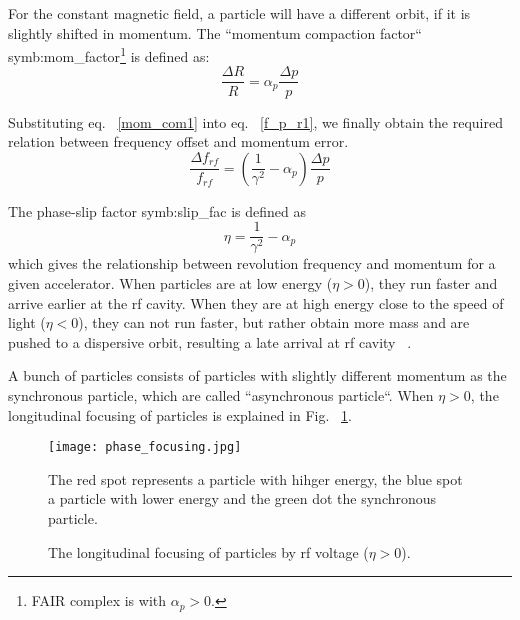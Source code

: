 For the constant magnetic field, a particle will have a different orbit, if it is slightly shifted in momentum. The ``momentum compaction factor`` \gls{symb:mom_factor}\footnote{FAIR complex is with $\alpha_p>0$.} is defined as:
\begin{equation}
\frac{\Delta R}{R}=\alpha_p\frac{\Delta p}{p}\label{mom_com1}
\end{equation} 


Substituting eq. ~\ref{mom_com1} into eq. ~\ref{f_p_r1}, we finally obtain the required relation between frequency offset and momentum error.
\begin{equation}
\frac{\Delta f_{\mathit{rf}}}{f_{\mathit{rf}}} = (\frac{1}{\gamma^2}-\alpha_{\mathit{p}})\frac{\Delta{p}}{p}
\label{eq:phaseP1}
\end{equation}

The phase-slip factor \gls{symb:slip_fac} is defined as
\begin{equation}
\label{eq:phse_slip}
\eta =\frac{1}{\gamma^2}-\alpha_{\mathit{p}}
\end{equation}
which gives the relationship between revolution frequency and momentum for a given accelerator. When particles are at low energy ($\eta > 0$), they run faster and arrive earlier at the rf cavity. When they are at high energy close to the speed of light ($\eta < 0$), they can not run faster, but rather obtain more mass and are pushed to a dispersive orbit, resulting a late arrival at rf cavity ~\cite{lee_accelerator_2011}. 

A bunch of particles consists of particles with slightly different momentum as the synchronous particle, which are called ``asynchronous particle``. When $\eta > 0$, the longitudinal focusing of particles is explained in Fig. ~\ref{phase_focusing}. 
\begin{figure}[!htb]
   \centering   
   \texttt{[image: phase\_focusing.jpg]}
   \caption{The longitudinal focusing of particles by rf voltage ($\eta > 0$).}{The red spot represents a particle with hihger energy, the blue spot a particle with lower energy and the green dot the synchronous particle.}
   \label{phase_focusing}
\end{figure}


